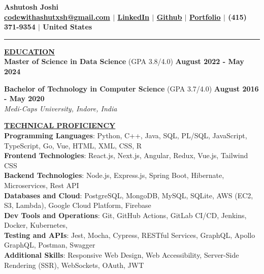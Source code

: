 \documentclass{article}
\begin{document}
\begin{center}
\thispagestyle{empty}
\large \textbf{Ashutosh Joshi \\}
\normalsize \textbf{\href{mailto:codewithashutxsh@gmail.com}{codewithashutxsh@gmail.com} $\mid$ \href{https://www.linkedin.com/in/ashutosh--joshi/}{LinkedIn} $\mid$ \href{https://github.com/ashutoshjoshi1}{Github} $\mid$ \href{https://ashutoshjoshi1.github.io/Portfolio/}{Portfolio} $\mid$ (415) 371-9354 $\mid$ United States \\}
\rule{\textwidth}{1pt}
\end{center}

\noindent \textbf{\underline{EDUCATION}} \\
\textbf{Master of Science in Data Science} (GPA 3.8/4.0)  \hfill \textbf{August 2022 - May 2024} \\

\begin{itemize}[noitemsep,nolistsep,leftmargin=*]
\end{itemize}
\vspace{2mm} 
\textbf{Bachelor of Technology in Computer Science} (GPA 3.7/4.0) \hfill \textbf{August 2016 - May 2020} \\
\textit{Medi-Caps University, Indore, India} 
\vspace{2mm} 

\noindent \textbf{\underline{TECHNICAL PROFICIENCY}} \\
\textbf{Programming Languages}{: \small Python, C++, Java, SQL, PL/SQL, JavaScript, TypeScript, Go, Vue, HTML, XML, CSS, R} \\
\textbf{Frontend Technologies}{: \small React.js, Next.js, Angular, Redux, Vue.js, Tailwind CSS} \\
\textbf{Backend Technologies}{: \small Node.js, Express.js, Spring Boot, Hibernate, Microservices, Rest API} \\
\textbf{Databases and Cloud}{: \small PostgreSQL, MongoDB, MySQL, SQLite, AWS (EC2, S3, Lambda), Google Cloud Platform, Firebase} \\
\textbf{Dev Tools and Operations}{: \small Git, GitHub Actions, GitLab CI/CD, Jenkins, Docker, Kubernetes,} \\
\textbf{Testing and APIs}{: \small Jest, Mocha, Cypress, RESTful Services, GraphQL, Apollo GraphQL, Postman, Swagger} \\
\textbf{Additional Skills}{: \small Responsive Web Design, Web Accessibility, Server-Side Rendering (SSR), WebSockets, OAuth, JWT}
\end{document}
